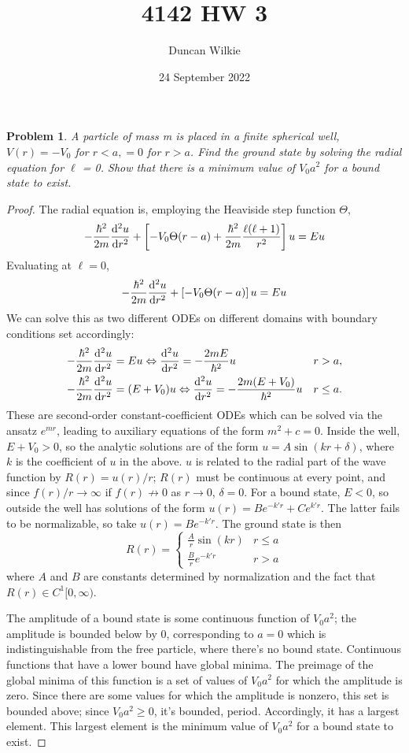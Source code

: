 \documentclass{article}
\title{4142 HW 3}
\author{Duncan Wilkie}
\date{24 September 2022}
\newtheorem{prob}{Problem}
\begin{document}
\maketitle

\begin{prob}
  A particle of mass m is placed in a finite spherical well, $V (r) = -V_{0}$ for $r < a, = 0$ for $r > a$.
  Find the ground state by solving the radial equation for $\ell$ = 0.
  Show that there is a minimum value of $V_{0}a^{2}$ for a bound state to exist.
\end{prob}
\begin{proof}
  The radial equation is, employing the Heaviside step function $\Theta$,
  \[
    -\frac{\hbar^{2}}{2m}\dv[2]{u}{r} + \left[ -V_{0}\Theta(r - a) + \frac{\hbar^{2}}{2m}\frac{\ell(\ell + 1)}{r^{2}}\right]u = Eu
  \]
  Evaluating at $\ell = 0$,
  \[
    -\frac{\hbar^{2}}{2m}\dv[2]{u}{r} + \left[ -V_{0}\Theta(r - a)\right]u = Eu
  \]
  We can solve this as two different ODEs on different domains with boundary conditions set accordingly:
  \begin{align*}
    -\frac{\hbar^{2}}{2m}\dv[2]{u}{r} &= Eu   \Leftrightarrow  \dv[2]{u}{r} = -\frac{2mE}{\hbar^{2}}u & r &> a, \\
    -\frac{\hbar^{2}}{2m}\dv[2]{u}{r} &= (E+V_{0})u  \Leftrightarrow  \dv[2]{u}{r} = -\frac{2m(E+V_{0})}{\hbar^{2}}u & r &\leq a.
  \end{align*}
  These are second-order constant-coefficient ODEs which can be solved via the ansatz $e^{mr}$, leading to auxiliary equations of the form $m^{2}+c = 0$.
  Inside the well, $E+V_{0} > 0$,  so the analytic solutions are of the form $u = A\sin(kr + \delta)$,
  where $k$ is the coefficient of $u$ in the above.
  $u$ is related to the radial part of the wave function by $R(r) = u(r) / r$; $R(r)$ must be continuous at every point,
  and since $f(r) / r \to \infty$ if $f(r) \not\to 0$ as $r\to 0$, $\delta = 0$.
  For a bound state, $E < 0$, so outside the well has solutions of the form $u(r) = Be^{-k'r}+Ce^{k'r}$.
  The latter fails to be normalizable, so take $u(r) = Be^{-k'r}$.
  The ground state is then
  \[
    R(r) =
    \begin{cases}
      \frac{A}{r}\sin(kr) & r \leq a \\
      \frac{B}{r}e^{-k'r}  & r > a
    \end{cases}
  \]
  where $A$ and $B$ are constants determined by normalization and the fact that $R(r)\in C^{1}[0,\infty)$.

  The amplitude of a bound state is some continuous function of $V_{0}a^{2}$; the amplitude is bounded below by 0,
  corresponding to $a = 0$ which is indistinguishable from the free particle, where there's no bound state.
  Continuous functions that have a lower bound have global minima.
  The preimage of the global minima of this function is a set of values of $V_{0}a^{2}$ for which the amplitude is zero.
  Since there are some values for which the amplitude is nonzero, this set is bounded above; since $V_{0}a^{2}\geq 0$, it's bounded, period.
  Accordingly, it has a largest element.
  This largest element is the minimum value of $V_{0}a^{2}$ for a bound state to exist.

\end{proof}
\end{document}
